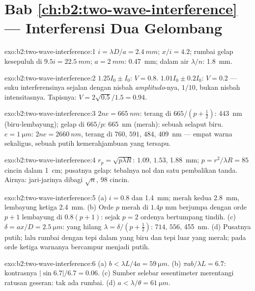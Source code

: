 \section*{Bab \ref{ch:b2:two-wave-interference} --- Interferensi Dua Gelombang}

\begin{solution}{exo:b2:two-wave-interference:1}
$i = \lambda D/a = \qty{2.4}{mm}$; $x/i = 4.2$; rumbai gelap kesepuluh di $9.5i = \qty{22.5}{mm}$;
$a = \qty{2}{mm}$: \qty{0.47}{mm}; dalam air $\lambda/n$: \qty{1.8}{mm}.
\end{solution}

\begin{solution}{exo:b2:two-wave-interference:2}
$1.25I_0 \pm I_0$: $V = 0.8$. $1.01I_0 \pm 0.2I_0$: $V = 0.2$ --- suku interferensinya
sejalan dengan nisbah \emph{amplitudo}-nya, $1/10$, bukan nisbah intensitasnya. Tapisnya:
$V = 2\sqrt{0.5}/1.5 = 0.94$.
\end{solution}

\begin{solution}{exo:b2:two-wave-interference:3}
$2ne = \qty{665}{nm}$: terang di $665/(p + \tfrac12)$: \qty{443}{nm} (biru-lembayung);
gelap di $665/p$: \qty{665}{nm} (merah): sebuah selaput biru. $e = \qty{1}{\micro m}$: $2ne = \qty{2660}{nm}$,
terang di $760$, $591$, $484$, \qty{409}{nm} --- empat warna sekaligus, sebuah
putih kemerahjambuan yang tersapu.
\end{solution}

\begin{solution}{exo:b2:two-wave-interference:4}
$r_p = \sqrt{p\lambda R}$: $1.09$, $1.53$, \qty{1.88}{mm}; $p = r^2/\lambda R = 85$ cincin dalam
\qty{1}{cm}; pusatnya gelap: tebalnya nol dan satu pembalikan tanda. Airnya:
jari-jarinya dibagi $\sqrt n$, $98$ cincin.
\end{solution}

\begin{solution}{exo:b2:two-wave-interference:5}
(a) $i = 0.8$ dan \qty{1.4}{mm}; merah kedua \qty{2.8}{mm}, lembayung ketiga \qty{2.4}{mm}.
(b) Orde $p$ merah di $1.4p$ mm berjumpa dengan orde $p + 1$ lembayung di $0.8(p + 1)$: sejak
$p = 2$ ordenya bertumpang tindih. (c) $\delta = ax/D = \qty{2.5}{\micro m}$: yang hilang $\lambda = \delta/(p +
\tfrac12)$: $714$, $556$, \qty{455}{nm}. (d) Pusatnya putih; lalu rumbai dengan
tepi dalam yang biru dan tepi luar yang merah; pada orde ketiga warnanya
bercampur menjadi putih.
\end{solution}

\begin{solution}{exo:b2:two-wave-interference:6}
(a) $b < \lambda L/4a = \qty{59}{\micro m}$. (b) $\pi ab/\lambda L = 6.7$: kontrasnya $|\sin6.7|/6.7
= 0.06$. (c) Sumber selebar sesentimeter merentangi ratusan 
geseran: tak ada rumbai. (d) $a < \lambda/\theta = \qty{61}{\micro m}$.
\end{solution}


